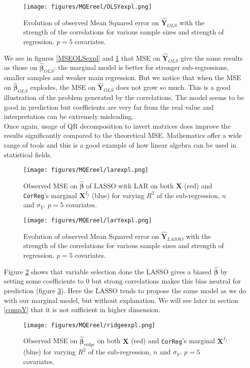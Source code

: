 \documentclass[12pt,a4paper]{report}
\begin{document}
	 \begin{figure}
	 \centering
	  \texttt{[image: figures/MQEreel/OLSYexpl.png]}
	  \caption{Evolution of observed Mean Squared error on $\hat{\boldsymbol{Y}}_{OLS}$ with the strength of the correlations for various sample sizes and strength of regression. $p=5$ covariates. } \label{MQEOLSYexpl}
	\end{figure}
	We see in figures \ref{MSEOLSexpl} and \ref{MQEOLSYexpl} that MSE on $\hat{\boldsymbol{Y}}_{OLS}$ give the same results as those on $\hat{\boldsymbol{\beta}}_{OLS}$: the marginal model is better for stronger sub-regressions, smaller samples and weaker main regression. But we notice that when the MSE on $\hat{\boldsymbol{\beta}}_{OLS}$ explodes, the MSE on $\hat{\boldsymbol{Y}}_{OLS}$ does not grow so much. This is a good illustration of the problem generated by the correlations. The model seems to be good in prediction but coefficients are very far from the real value and interpretation can be extremely misleading.\\
	Once again, usage of QR decomposition to invert matrices does improve the results significantly compared to the theoretical MSE. Mathematics offer a wide range of tools and this is a good example of how linear algebra can be used in statistical fields. \\
	
	
 \begin{figure}[h!]
	\texttt{[image: figures/MQEreel/larexpl.png]}
	\caption{Observed MSE on $\hat{\boldsymbol{\beta}}$ of LASSO with LAR on both $\boldsymbol{X}$ (red) and {\tt CorReg}'s marginal $\boldsymbol{X}^{I_f}$ (blue) for varying $R^2$ of the sub-regression, $n$ and $\sigma_Y$. $p=5$ covariates.}\label{MSElarexpl}
\end{figure} 
	
	 \begin{figure}
	 \centering
	  \texttt{[image: figures/MQEreel/larYexpl.png]}
	  \caption{Evolution of observed Mean Squared error on $\hat{\boldsymbol{Y}}_{LASSO}$ with the strength of the correlations for various sample sizes and strength of regression. $p=5$ covariates. } \label{MQElarYexpl}
	\end{figure}
	Figure \ref{MSElarexpl} shows that variable selection done the LASSO gives a biased $\hat{\boldsymbol{\beta}}$ by setting some coefficients to 0 but strong correlations makes this bias neutral for prediction (figure \ref{MQElarYexpl}). Here the LASSO tends to propose the same model as we do  with our marginal model, but without explanation. We will see  later in section \ref{compY} that it is not sufficient in higher dimension. \\
	\begin{figure}[h!]
	\texttt{[image: figures/MQEreel/ridgeexpl.png]}
	\caption{Observed MSE on $\hat{\boldsymbol{\beta}}_{ridge}$ on both $\boldsymbol{X}$ (red) and {\tt CorReg}'s marginal $\boldsymbol{X}^{I_f}$ (blue) for varying $R^2$ of the sub-regression, $n$ and $\sigma_Y$. $p=5$ covariates.}\label{MSEridgexpl}
\end{figure} 
	
\end{document}
